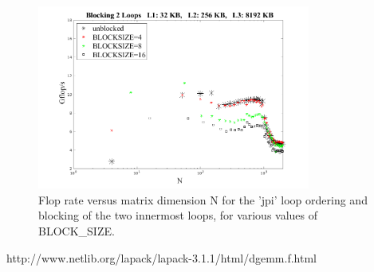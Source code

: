 \documentclass[12pt]{article}
\begin{document}
\begin{figure}[ht]
\vspace*{-0.05in}
\centering
    \includegraphics[width=0.8\textwidth]{Fig_3.png}
  \caption{Flop rate versus matrix dimension N for the 'jpi'
           loop ordering and blocking of the two innermost loops,
           for various values of BLOCK\_SIZE.}
  \label{fig3}
\end{figure}

\begin{thebibliography}{99}

 http://www.netlib.org/lapack/lapack-3.1.1/html/dgemm.f.html

\end{thebibliography}
\end{document}
